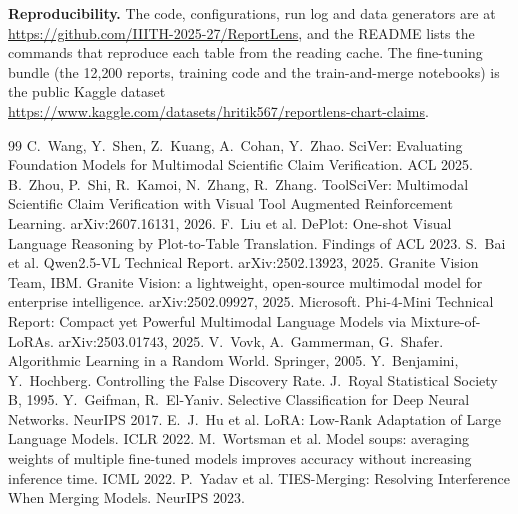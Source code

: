 \documentclass[11pt,a4paper]{article}
\begin{document}
\textbf{Reproducibility.} The code, configurations, run log and data generators are at \url{https://github.com/IIITH-2025-27/ReportLens}, and the README lists the commands that reproduce each table from the reading cache. The fine-tuning bundle (the 12{,}200 reports, training code and the train-and-merge notebooks) is the public Kaggle dataset \url{https://www.kaggle.com/datasets/hritik567/reportlens-chart-claims}.

\begin{thebibliography}{99}\setlength{\itemsep}{0pt}\small
{} C.~Wang, Y.~Shen, Z.~Kuang, A.~Cohan, Y.~Zhao. SciVer: Evaluating Foundation Models for Multimodal Scientific Claim Verification. ACL 2025.
 B.~Zhou, P.~Shi, R.~Kamoi, N.~Zhang, R.~Zhang. ToolSciVer: Multimodal Scientific Claim Verification with Visual Tool Augmented Reinforcement Learning. arXiv:2607.16131, 2026.
 F.~Liu et al. DePlot: One-shot Visual Language Reasoning by Plot-to-Table Translation. Findings of ACL 2023.
 S.~Bai et al. Qwen2.5-VL Technical Report. arXiv:2502.13923, 2025.
 Granite Vision Team, IBM. Granite Vision: a lightweight, open-source multimodal model for enterprise intelligence. arXiv:2502.09927, 2025.
 Microsoft. Phi-4-Mini Technical Report: Compact yet Powerful Multimodal Language Models via Mixture-of-LoRAs. arXiv:2503.01743, 2025.
 V.~Vovk, A.~Gammerman, G.~Shafer. Algorithmic Learning in a Random World. Springer, 2005.
 Y.~Benjamini, Y.~Hochberg. Controlling the False Discovery Rate. J.\ Royal Statistical Society B, 1995.
 Y.~Geifman, R.~El-Yaniv. Selective Classification for Deep Neural Networks. NeurIPS 2017.
 E.~J.~Hu et al. LoRA: Low-Rank Adaptation of Large Language Models. ICLR 2022.
 M.~Wortsman et al. Model soups: averaging weights of multiple fine-tuned models improves accuracy without increasing inference time. ICML 2022.
 P.~Yadav et al. TIES-Merging: Resolving Interference When Merging Models. NeurIPS 2023.
\end{thebibliography}
\end{document}
